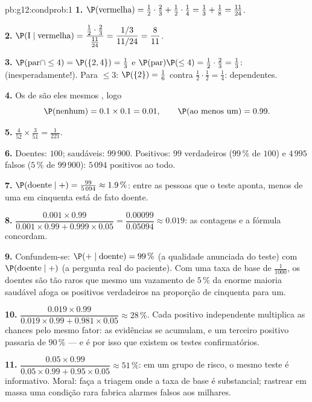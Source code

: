 \begin{solution}{pb:g12:condprob:1}
\textbf{1.} $\P(\text{vermelha}) = \frac12 \cdot \frac23 +
\frac12 \cdot \frac14 = \frac13 + \frac18 = \frac{11}{24}$.

\textbf{2.} $\P(\text{I} \mid \text{vermelha}) =
\dfrac{\frac12 \cdot \frac23}{\frac{11}{24}} =
\dfrac{1/3}{11/24} = \dfrac{8}{11}$.

\textbf{3.} $\P(\text{par} \cap \leq 4) = \P(\{2, 4\}) =
\frac13$ e $\P(\text{par})\P(\leq 4) = \frac12 \cdot
\frac23 = \frac13$:  (inesperadamente!). Para
$\leq 3$: $\P(\{2\}) = \frac16$ contra
$\frac12 \cdot \frac12 = \frac14$: dependentes.

\textbf{4.} Os  de   são
eles mesmos , logo
\[
\P(\text{nenhum}) = 0.1 \times 0.1 = 0.01,
\qquad
\P(\text{ao menos um}) = 0.99 .
\]

\textbf{5.} $\frac{4}{52} \times \frac{3}{51} =
\frac{1}{221}$.

\textbf{6.} Doentes: $100$; saudáveis: $99\,900$. Positivos:
$99$ verdadeiros ($99\,\%$ de $100$) e $4\,995$ falsos
($5\,\%$ de $99\,900$): $5\,094$ positivos ao todo.

\textbf{7.} $\P(\text{doente} \mid +) = \frac{99}{5\,094}
\approx 1.9\,\%$: entre as pessoas que o teste aponta, menos
de uma em cinquenta está de fato doente.

\textbf{8.} $\dfrac{0.001 \times 0.99}{0.001 \times 0.99 +
0.999 \times 0.05} = \dfrac{0.00099}{0.05094} \approx 0.019$:
as contagens e a fórmula concordam.

\textbf{9.} Confundem-se: $\P(+ \mid \text{doente}) =
99\,\%$ (a qualidade anunciada do teste) com
$\P(\text{doente} \mid +)$ (a pergunta real do paciente). Com
uma taxa de base de $\frac{1}{1000}$, os doentes são tão raros
que mesmo um vazamento de $5\,\%$ da enorme maioria saudável
afoga os positivos verdadeiros na proporção de cinquenta para
um.

\textbf{10.} $\dfrac{0.019 \times 0.99}{0.019 \times 0.99 +
0.981 \times 0.05} \approx 28\,\%$. Cada positivo
independente multiplica as chances pelo mesmo fator: as
evidências se acumulam, e um terceiro positivo passaria de
$90\,\%$ --- e é por isso que existem os testes
confirmatórios.

\textbf{11.} $\dfrac{0.05 \times 0.99}{0.05 \times 0.99 +
0.95 \times 0.05} \approx 51\,\%$: em um grupo de risco, o
mesmo teste é informativo. Moral: faça a triagem onde a taxa
de base é substancial; rastrear em massa uma condição rara
fabrica alarmes falsos aos milhares.


\end{solution}
